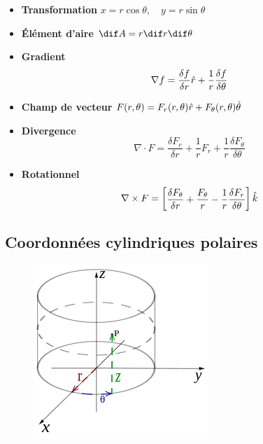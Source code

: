 \begin{itemize}
  \item{\textbf{Transformation}}
    $ x = r \cos{\theta} , \quad y = r \sin{\theta}$
  \item{\textbf{Élément d'aire}}
    $\dif A = r \dif r \dif\theta$
  \item{\textbf{Gradient}}
    $$\nabla f = \dfrac{\delta f}{\delta r} \Hat{r} + \dfrac{1}{r} \dfrac{\delta f}{\delta \theta}$$

  \item{\textbf{Champ de vecteur}} $F(r,\theta) = F_r(r,\theta) \Hat{r} + F_\theta(r,\theta)\Hat{\theta}$

  \item{\textbf{Divergence}}
    $$
    \nabla \cdot F = \dfrac{\delta F_r}{\delta r}+ \dfrac{1}{r} F_r + \dfrac{1}{r} \dfrac{\delta F_\theta}{\delta \theta}
    $$

  \item{\textbf{Rotationnel}}
    $$
    \nabla \times F=
    \begin{bmatrix}
      \dfrac { \delta { F }_{ \theta } }{ \delta r }  + \dfrac{F_\theta}{r}-\dfrac{1}{r} \dfrac{\delta F_r}{\delta \theta}
    \end{bmatrix}
    \Hat{k}
    $$
\end{itemize}

\subsection{Coordonnées cylindriques polaires}

\begin{figure}[ht!]
  \centering
  \includegraphics[scale = 0.5]{cylindre.png}
\end{figure}

